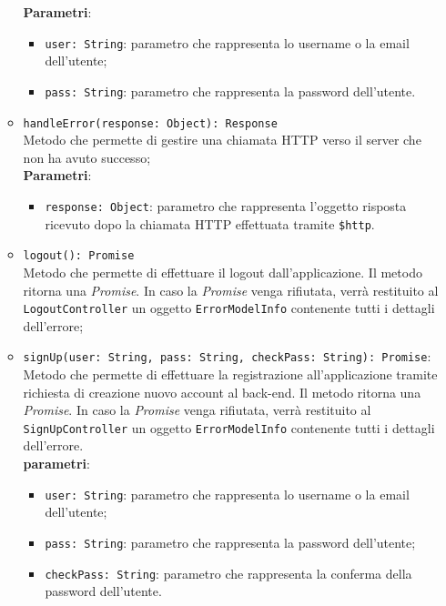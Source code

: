 \begin{itemize}
\begin{itemize}
			\textbf{Parametri}: 
			\begin{itemize}
				\item \texttt{user: String}: parametro che rappresenta lo username o la email dell'utente;
				\item \texttt{pass: String}: parametro che rappresenta la password dell'utente.
			\end{itemize}
		\item \texttt{handleError(response: Object): Response} \\ Metodo che permette di gestire una chiamata HTTP verso il server che non ha avuto successo; \\
			\textbf{Parametri}:
			\begin{itemize}
				\item \texttt{response: Object}: parametro che rappresenta l'oggetto risposta ricevuto dopo la chiamata HTTP effettuata tramite \texttt{\$http}.
			\end{itemize}
		\item \texttt{logout(): Promise} \\ Metodo che permette di effettuare il logout dall'applicazione. Il metodo ritorna una \textit{Promise}. In caso la \textit{Promise} venga rifiutata, verrà restituito al \texttt{LogoutController} un oggetto \texttt{ErrorModelInfo} contenente tutti i dettagli dell'errore; \\
		\item \texttt{signUp(user: String, pass: String, checkPass: String): Promise}: \\Metodo che permette di effettuare la registrazione all'applicazione tramite richiesta di creazione nuovo account al back-end. Il metodo ritorna una \textit{Promise}. In caso la \textit{Promise} venga rifiutata, verrà restituito al \texttt{SignUpController} un oggetto \texttt{ErrorModelInfo} contenente tutti i dettagli dell'errore. \\
			\textbf{parametri}:
			\begin{itemize}
				\item \texttt{user: String}: parametro che rappresenta lo username o la email dell'utente;
				\item \texttt{pass: String}: parametro che rappresenta la password dell'utente;
				\item \texttt{checkPass: String}: parametro che rappresenta la conferma della password dell'utente.
			\end{itemize}
	\end{itemize}
\end{itemize}

